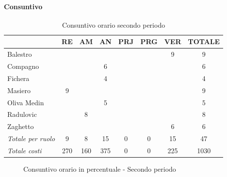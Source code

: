 \documentclass[a4paper,12pt]{article}
\begin{document}
            \paragraph{Consuntivo}
                \begin{table}[H]
                \centering
                \begin{tabular}{|l|c|c|c|c|c|c|c|}
                \hline
                    \rowcolor{lightgray}{\textbf{Membro}} & {\textbf{RE}} & {\textbf{AM}} & {\textbf{AN}} & {\textbf{PRJ}} & {\textbf{PRG}} & {\textbf{VER}} & {\textbf{TOTALE}}\\
                \hline
                    Balestro & & & & & & 9 & 9\\
                \hline
                    Compagno & & & 6 & & & & 6\\
                \hline
                    Fichera & & & 4 & & & & 4\\
                \hline
                    Masiero & 9 & & & & & & 9\\
                \hline
                    Oliva Medin & & & 5 & & & & 5\\
                \hline
                    Radulovic & & 8 & & & & & 8\\
                \hline
                    Zaghetto & & & & & & 6 & 6\\
                \hline
                    \rowcolor{lightgray}\textit{Totale per ruolo} & 9 & 8 & 15 & 0 & 0 & 15 & 47\\
                \hline
                    \rowcolor{lightgray}\textit{Totale costi} & 270 & 160 & 375 & 0 & 0 & 225 & 1030\\
                \hline
                \end{tabular}
                \caption{Consuntivo orario secondo periodo}
                \end{table}

                \begin{figure}[H]
                \centering
                \caption{Consuntivo orario in percentuale - Secondo periodo}
                \end{figure}
                
\end{document}
